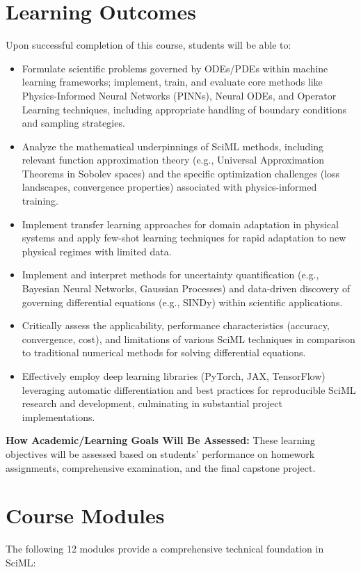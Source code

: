 \documentclass[11pt,fourier]{article}
\begin{document}
	\section*{Learning Outcomes}
	Upon successful completion of this course, students will be able to:
	\begin{itemize}
		\item Formulate scientific problems governed by ODEs/PDEs within machine learning frameworks; implement, train, and evaluate core methods like Physics-Informed Neural Networks (PINNs), Neural ODEs, and Operator Learning techniques, including appropriate handling of boundary conditions and sampling strategies.
		\item Analyze the mathematical underpinnings of SciML methods, including relevant function approximation theory (e.g., Universal Approximation Theorems in Sobolev spaces) and the specific optimization challenges (loss landscapes, convergence properties) associated with physics-informed training.
		\item Implement transfer learning approaches for domain adaptation in physical systems and apply few-shot learning techniques for rapid adaptation to new physical regimes with limited data.
		\item Implement and interpret methods for uncertainty quantification (e.g., Bayesian Neural Networks, Gaussian Processes) and data-driven discovery of governing differential equations (e.g., SINDy) within scientific applications.
		\item Critically assess the applicability, performance characteristics (accuracy, convergence, cost), and limitations of various SciML techniques in comparison to traditional numerical methods for solving differential equations.
		\item Effectively employ deep learning libraries (PyTorch, JAX, TensorFlow) leveraging automatic differentiation and best practices for reproducible SciML research and development, culminating in substantial project implementations.
	\end{itemize}
	
	\textbf{How Academic/Learning Goals Will Be Assessed:} These learning objectives will be assessed based on students' performance on homework assignments, comprehensive examination, and the final capstone project.
	
	\section*{Course Modules}
	The following 12 modules provide a comprehensive technical foundation in SciML:
	
\end{document}

